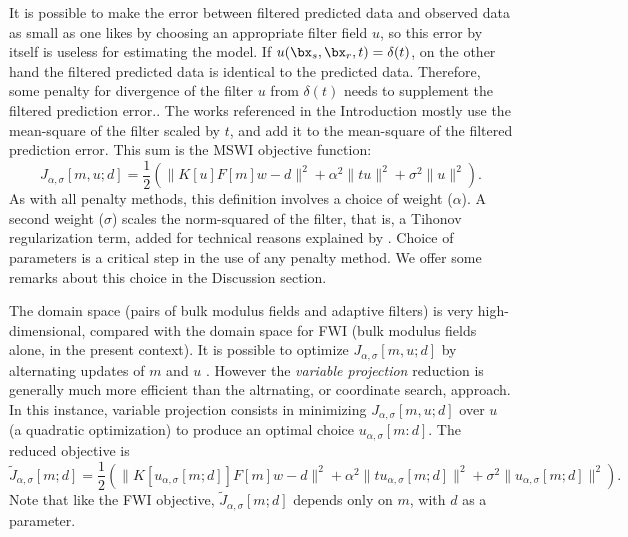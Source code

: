 It is possible to make the error between filtered predicted data and
observed data as small as one likes by choosing an appropriate filter
field $u$, so this error by itself is useless for estimating the
model. If $u(\bx_s,\bx_r,t)=\delta(t)$, on the other hand the filtered
predicted data is identical to the predicted data.
Therefore, some penalty for divergence of the filter $u$ from
$\delta(t)$ needs to supplement the filtered prediction error.. The works referenced in the Introduction mostly use the
mean-square of the filter scaled by $t$, and add it to the mean-square
of the filtered prediction error. This sum is the MSWI objective function:
\begin{equation}
  \label{eqn:filtpen}
  J_{\alpha,\sigma}[m,u;d]=\frac{1}{2}(\|K[u]F[m]w-d\|^2
  +\alpha^2\|tu\|^2 + \sigma^2\|u\|^2).
\end{equation}
As with all penalty methods, this definition involves a choice of
weight ($\alpha$). A second weight ($\sigma$) scales the norm-squared
of the filter, that is, a Tihonov regularization term, added for
technical reasons explained by \cite{Warner:16,Symes:24a}. Choice of
parameters is a critical step in the use of any penalty method. We
offer some remarks about this choice in the Discussion section.

The domain space (pairs of bulk modulus fields and adaptive filters)
is very high-dimensional, compared with the domain space for FWI (bulk
modulus fields alone, in the present context). It is possible to
optimize $J_{\alpha,\sigma}[m,u;d]$ by alternating updates of $m$ and
$u$  \cite[]{LiAlkhalifah:21}. However the {\em variable projection} \cite[]{GolubPereyra:73,GolubPereyra:03}
reduction is generally much more efficient than the altrnating, or
coordinate search, approach. In this instance, variable projection
consists in minimizing $J_{\alpha,\sigma}[m,u;d]$ over $u$ (a
quadratic optimization) to produce an optimal choice
$u_{\alpha,\sigma}[m:d]$. The reduced objective is
\begin{equation}
  \label{eqn:redfiltpen}
  \tilde{J}_{\alpha,\sigma}[m;d]=\frac{1}{2}(\|K[u_{\alpha,\sigma}[m;d]]F[m]w-d\|^2
  +\alpha^2\|tu_{\alpha,\sigma}[m;d]\|^2 + \sigma^2\|u_{\alpha,\sigma}[m;d]\|^2).
\end{equation}
Note that like the FWI objective, $\tilde{J}_{\alpha,\sigma}[m;d]$
depends only on $m$, with $d$ as a parameter.

